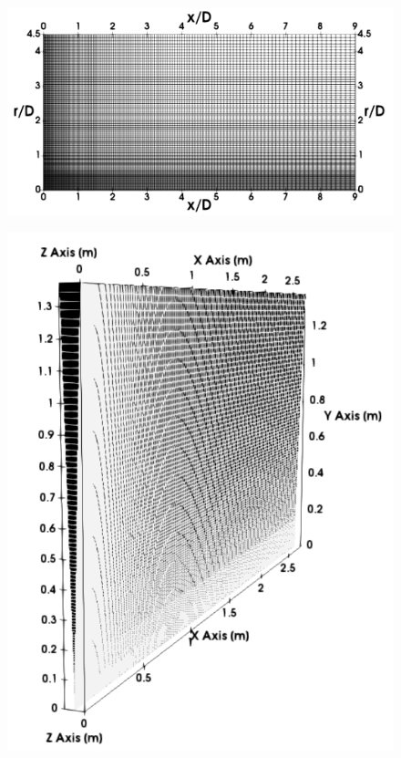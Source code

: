 \begin{figure}[H]
    \centering
    \includegraphics[width=0.95\linewidth]{figs/SandiaD/Screenshot from 2025-03-12 08-14-26.png}
    \label{fig:domain2}
\end{figure}

\begin{figure}[H]
    \centering
    \includegraphics[width=0.65\linewidth]{figs/SandiaD/Screenshot from 2025-03-12 08-15-01.png}
    \label{fig:domain2}
\end{figure}

